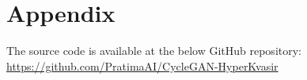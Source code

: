 \documentclass[UKenglish,12pt]{master-style}
\begin{document}
\chapter*{Appendix}
\label{appendix}

The source code is available at the below GitHub repository:\\
\url{https://github.com/PratimaAI/CycleGAN-HyperKvasir}




\backmatter
\printbibliography
\end{document}
